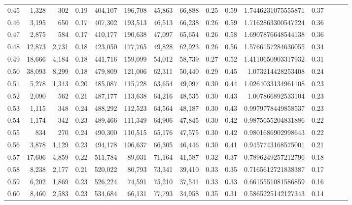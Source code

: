 \begin{tabular}{rrrrrrrrrrrrrrr}
0.45 &   1,328 &    302 &  0.19 &  404,107 &  196,708 &   45,863 &   66,888 &  0.25 &  0.59 &    1.7446231075555871 &      0.37 \\
0.46 &   3,195 &    650 &  0.17 &  407,302 &  193,513 &   46,513 &   66,238 &  0.26 &  0.59 &    1.7162863300547224 &      0.36 \\
0.47 &   2,875 &    584 &  0.17 &  410,177 &  190,638 &   47,097 &   65,654 &  0.26 &  0.58 &    1.6907876648544138 &      0.36 \\
0.48 &  12,873 &  2,731 &  0.18 &  423,050 &  177,765 &   49,828 &   62,923 &  0.26 &  0.56 &    1.5766157284636055 &      0.34 \\
0.49 &  18,666 &  4,184 &  0.18 &  441,716 &  159,099 &   54,012 &   58,739 &  0.27 &  0.52 &    1.4110650903317932 &      0.31 \\
0.50 &  38,093 &  8,299 &  0.18 &  479,809 &  121,006 &   62,311 &   50,440 &  0.29 &  0.45 &     1.073214428253408 &      0.24 \\
0.51 &   5,278 &  1,343 &  0.20 &  485,087 &  115,728 &   63,654 &   49,097 &  0.30 &  0.44 &    1.0264033134961108 &      0.23 \\
0.52 &   2,090 &    562 &  0.21 &  487,177 &  113,638 &   64,216 &   48,535 &  0.30 &  0.43 &     1.007866892533104 &      0.23 \\
0.53 &   1,115 &    348 &  0.24 &  488,292 &  112,523 &   64,564 &   48,187 &  0.30 &  0.43 &    0.9979778449858537 &      0.23 \\
0.54 &   1,174 &    342 &  0.23 &  489,466 &  111,349 &   64,906 &   47,845 &  0.30 &  0.42 &    0.9875655204831886 &      0.22 \\
0.55 &     834 &    270 &  0.24 &  490,300 &  110,515 &   65,176 &   47,575 &  0.30 &  0.42 &    0.9801686902998643 &      0.22 \\
0.56 &   3,878 &  1,129 &  0.23 &  494,178 &  106,637 &   66,305 &   46,446 &  0.30 &  0.41 &    0.9457743168575001 &      0.21 \\
0.57 &  17,606 &  4,859 &  0.22 &  511,784 &   89,031 &   71,164 &   41,587 &  0.32 &  0.37 &    0.7896249257212796 &      0.18 \\
0.58 &   8,238 &  2,177 &  0.21 &  520,022 &   80,793 &   73,341 &   39,410 &  0.33 &  0.35 &    0.7165612721838387 &      0.17 \\
0.59 &   6,202 &  1,869 &  0.23 &  526,224 &   74,591 &   75,210 &   37,541 &  0.33 &  0.33 &    0.6615551081586859 &      0.16 \\
0.60 &   8,460 &  2,583 &  0.23 &  534,684 &   66,131 &   77,793 &   34,958 &  0.35 &  0.31 &    0.5865225142127343 &      0.14 \\

\end{tabular}
